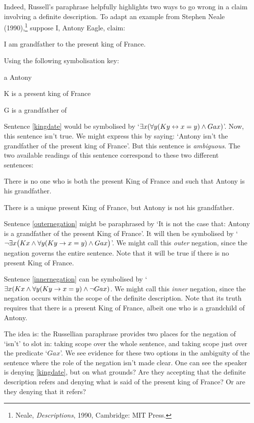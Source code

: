 Indeed, Russell's paraphrase helpfully highlights two ways to go wrong in a claim involving a definite description. To adapt an example from Stephen Neale (1990),\footnote{Neale, \emph{Descriptions}, 1990, Cambridge: MIT Press.}  suppose I, Antony Eagle, claim:
	\begin{earg}
		\item[\ex{kingdate}] I am grandfather to the present king of France.
	\end{earg}
Using the following symbolisation key:
	\begin{ekey}
		\item[a] Antony
		\item[K\meta{x}]  is a present king of France
		\item[G\meta{xy}]  is a grandfather of 
	\end{ekey}
Sentence \ref{kingdate} would be symbolised by `$\exists x (\forall y(Ky \leftrightarrow  x = y) \wedge Gax)$'. Now, this sentence isn't true. We might express this by saying: `Antony isn't the grandfather of the present king of France'. But this sentence is \emph{ambiguous}. The two available readings of this sentence correspond to these two different sentences:
	\begin{earg}
		\item[\ex{outernegation}] There is no one who is both the present King of France and  such that Antony is his grandfather.
		\item[\ex{innernegation}] There is a unique present King of France, but Antony is not his grandfather.
	\end{earg}
Sentence \ref{outernegation} might be paraphrased by `It is not the case that: Antony is a grandfather of the present King of France'. It will then be symbolised by `$\neg \exists x\bigl(Kx \wedge \forall y(Ky \rightarrow  x = y) \wedge Gax \bigr)$'. We might call this \emph{outer} negation, since the negation governs the entire sentence. Note that it will be true if there is no present King of France.

Sentence \ref{innernegation} can be symbolised by `$\exists x (Kx \wedge \forall y(Ky \rightarrow x = y) \wedge \neg Gax)$. We might call this \emph{inner} negation, since the negation occurs within the scope of the definite description. Note that its truth requires that there is a present King of France, albeit one who is a grandchild of Antony.

The idea is: the Russellian paraphrase provides two places for the negation of `isn't' to slot in: taking scope over the whole sentence, and taking scope just over the predicate `$Gax$'.  We see evidence for these two options in the ambiguity of the sentence where the role of the negation isn't made clear. One can see the speaker is denying \ref{kingdate}, but on what grounds? Are they accepting that the definite description refers and denying what is said of the present king of France? Or are they denying that it refers?



